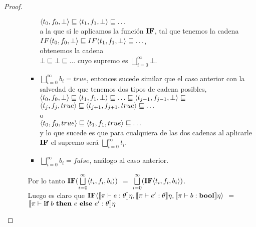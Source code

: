 \begin{proof}
\begin{itemize}
\begin{itemize}
\begin{itemize}
$\langle t_0,f_0,\bot \rangle \sqsubseteq \langle t_1,f_1,\bot \rangle \sqsubseteq \ldots$ \\

a la que si le aplicamos la funci\'on $\textbf{IF}$, tal que tenemos la cadena \\

$IF \langle t_0,f_0,\bot \rangle \sqsubseteq IF \langle t_1,f_1,\bot \rangle \sqsubseteq \ldots$, \\

obtenemos la cadena\\

$\bot \sqsubseteq \bot \sqsubseteq \ldots$ cuyo supremo es $\bigsqcup\limits^{\infty}_{i=0} \bot$.\\

\item $\bigsqcup\limits^{\infty}_{i=0}b_i = true$, entonces sucede similar que el caso anterior
con la salvedad de que tenemos dos tipos de cadena posibles,\\

$\langle t_0,f_0,\bot \rangle \sqsubseteq \langle t_1,f_1,\bot \rangle 
		\sqsubseteq \ldots \sqsubseteq \langle t_{j-1},f_{j-1},\bot \rangle \sqsubseteq $\\
$\langle t_j,f_j,true \rangle \sqsubseteq \langle t_{j+1},f_{j+1},true \rangle \sqsubseteq \ldots $\\

o \\

$\langle t_0,f_0,true \rangle \sqsubseteq \langle t_1,f_1,true \rangle \sqsubseteq \ldots$ \\

y lo que sucede es que para cualquiera de las dos cadenas al aplicarle $\textbf{IF}$ el supremo ser\'a 
$\bigsqcup\limits^{\infty}_{i=0} t_i$.

\item $\bigsqcup\limits^{\infty}_{i=0}b_i = false$, an\'alogo al caso anterior.

\end{itemize}

Por lo tanto $\textbf{IF} (\bigsqcup\limits^{\infty}_{i=0}\langle t_i,f_i,b_i \rangle)$ $=$
$\bigsqcup\limits^{\infty}_{i=0} (\textbf{IF} \langle t_i,f_i,b_i \rangle)$.\\

Luego es claro que $\textbf{IF} \langle  \llbracket \pi \vdash e : \theta \rrbracket\eta
					  			  , \llbracket \pi \vdash e' : \theta \rrbracket\eta
								  , \llbracket \pi \vdash b : \textbf{bool} \rrbracket\eta
								   \rangle$ $=$
$\llbracket \pi \vdash \textbf{if} \ b \ \textbf{then} \ e \ \textbf{else} \ e' : \theta \rrbracket\eta$


\end{itemize}
\end{itemize}
\end{proof}

